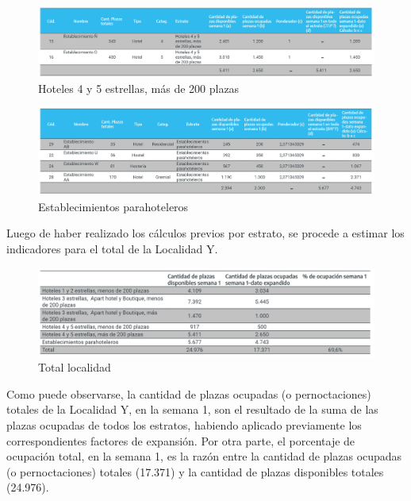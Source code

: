 \documentclass[
]{book}
\begin{document}
\begin{figure}

{\centering \includegraphics[width=1\linewidth]{imagenes/hoteles4_5_estrellas_mas_200_plazas} 

}

\caption{Hoteles 4 y 5 estrellas, más de 200 plazas}\label{fig:4-5-estrellas-mas200}
\end{figure}

\begin{figure}

{\centering \includegraphics[width=1\linewidth]{imagenes/establecimientos_parahoteleros} 

}

\caption{Establecimientos parahoteleros}\label{fig:para-hoteleros}
\end{figure}

Luego de haber realizado los cálculos previos por estrato, se procede a estimar los indicadores para el total de la Localidad Y.

\begin{figure}

{\centering \includegraphics[width=1\linewidth]{imagenes/figuras_parte123_01} 

}

\caption{Total localidad}\label{fig:total-localodad-y}
\end{figure}

Como puede observarse, la cantidad de plazas ocupadas (o pernoctaciones) totales de la Localidad Y, en la semana 1, son el resultado de la suma de las plazas ocupadas de todos los estratos, habiendo aplicado previamente los correspondientes factores de expansión. Por otra parte, el porcentaje de ocupación total, en la semana 1, es la razón entre la cantidad de plazas ocupadas (o pernoctaciones) totales (17.371) y la cantidad de plazas disponibles totales (24.976).

  
\end{document}
